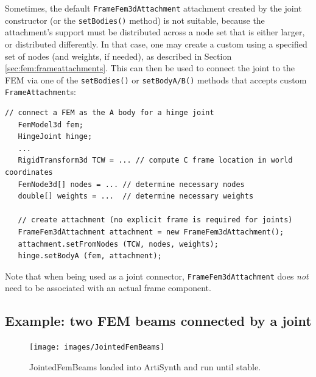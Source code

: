 Sometimes, the default {\tt FrameFem3dAttachment} attachment created by the
joint constructor (or the {\tt setBodies()} method) is not suitable, because
the attachment's support must be distributed across a node set that is either
larger, or distributed differently. In that case, one may create a custom
using a specified set of nodes (and weights, if needed), as described in
Section \ref{sec:fem:frameattachments}. This can then be used to connect the
joint to the FEM via one of the {\tt setBodies()} or {\tt setBodyA/B()} methods
that accepts custom {\tt FrameAttachment}s:
%
\begin{lstlisting}[]
   // connect a FEM as the A body for a hinge joint
   FemModel3d fem;
   HingeJoint hinge;
   ...
   RigidTransform3d TCW = ... // compute C frame location in world coordinates
   FemNode3d[] nodes = ... // determine necessary nodes
   double[] weights = ...  // determine necessary weights

   // create attachment (no explicit frame is required for joints)
   FrameFem3dAttachment attachment = new FrameFem3dAttachment();
   attachment.setFromNodes (TCW, nodes, weights);
   hinge.setBodyA (fem, attachment);   
\end{lstlisting}
%
Note that when being used as a joint connector, {\tt FrameFem3dAttachment} does
{\it not} need to be associated with an actual frame component.

\subsection{Example: two FEM beams connected by a joint}

\begin{figure}[ht]
	\centering
	\texttt{[image: images/JointedFemBeams]}
	\caption{JointedFemBeams loaded into ArtiSynth and run until stable.}
	\label{fig:fem:jointFemBeams}
\end{figure}


